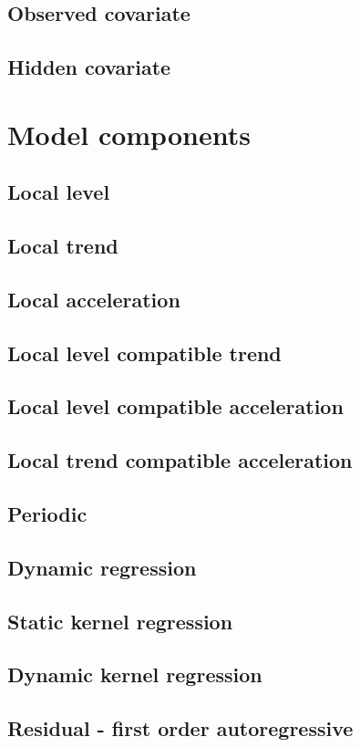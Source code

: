 \documentclass{book}
\begin{document}
\subsection{Observed covariate}
\subsection{Hidden covariate}
\section{Model components}
\subsection{Local level}
\subsection{Local trend}
\subsection{Local acceleration}
\subsection{Local level compatible trend}
\subsection{Local level compatible acceleration}
\subsection{Local trend compatible acceleration}
\subsection{Periodic}
\subsection{Dynamic regression}
\subsection{Static kernel regression}
\subsection{Dynamic kernel regression}
\subsection{Residual - first order autoregressive}
\end{document}

